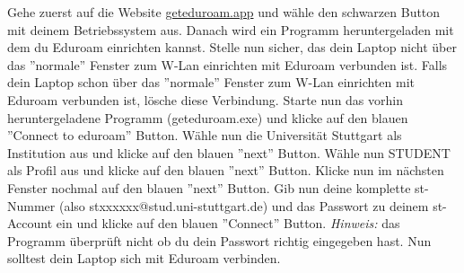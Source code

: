 
\label{ex1}
Gehe zuerst auf die Website \href{eduroamurl}{geteduroam.app} und wähle den schwarzen Button mit deinem Betriebssystem aus. Danach wird ein Programm heruntergeladen mit dem du Eduroam einrichten kannst.\newline
Stelle nun sicher, das dein Laptop nicht über das ''normale'' Fenster zum W-Lan einrichten mit Eduroam verbunden ist. Falls dein Laptop schon über das ''normale'' Fenster zum W-Lan einrichten mit Eduroam verbunden ist, lösche diese Verbindung.\newline
Starte nun das vorhin heruntergeladene Programm (geteduroam.exe) und klicke auf den blauen ''Connect to eduroam'' Button. Wähle nun die Universität Stuttgart als Institution aus und klicke auf den blauen ''next'' Button. Wähle nun STUDENT als Profil aus und klicke auf den blauen ''next'' Button. Klicke nun im nächsten Fenster nochmal auf den blauen ''next'' Button. Gib nun deine komplette st-Nummer (also stxxxxxx@stud.uni-stuttgart.de) und das Passwort zu deinem st-Account ein und klicke auf den blauen ''Connect'' Button. \textit{Hinweis:} das Programm überprüft nicht ob du dein Passwort richtig eingegeben hast.\newline
Nun solltest dein Laptop sich mit Eduroam verbinden.\newline
